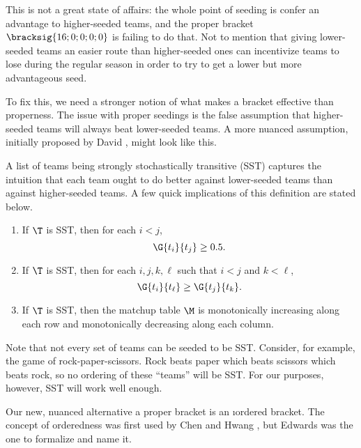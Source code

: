 {    This is not a great state of affairs: the whole point of seeding is confer an advantage to higher-seeded teams, and the proper bracket $\bracksig{16; 0; 0; 0; 0}$ is failing to do that. Not to mention that giving lower-seeded teams an easier route than higher-seeded ones can incentivize teams to lose during the regular season in order to try to get a lower but more advantageous seed.

    To fix this, we need a stronger notion of what makes a bracket effective than properness. The issue with proper seedings is the false assumption that higher-seeded teams will always beat lower-seeded teams. A more nuanced assumption, initially proposed by David \cite{stochastic}, might look like this.


    A list of teams being strongly stochastically transitive (SST) captures the intuition that each team ought to do better against lower-seeded teams than against higher-seeded teams. A few quick implications of this definition are stated below.

    \begin{corollary}{}{}
        \begin{enumerate}[(1)]
            \item If $\T$ is SST, then for each $i < j$, $$\G{t_i}{t_j} \geq 0.5.$$
            \item If $\T$ is SST, then for each $i, j, k, \ell$ such that $i < j$ and $k < \ell$, $$\G{t_i}{t_\ell} \geq \G{t_j}{t_k}.$$
            \item If $\T$ is SST, then the matchup table $\M$ is monotonically increasing along each row and monotonically decreasing along each column.
        \end{enumerate}
    \end{corollary}

    Note that not every set of teams can be seeded to be SST. Consider, for example, the game of rock-paper-scissors. Rock beats paper which beats scissors which beats rock, so no ordering of these ``teams'' will be SST. For our purposes, however, SST will work well enough.

    Our new, nuanced alternative a proper bracket is an \i{ordered bracket}. The concept of orderedness was first used by Chen and Hwang \cite{define_ordered}, but Edwards \cite{montana} was the one to formalize and name it.

}
